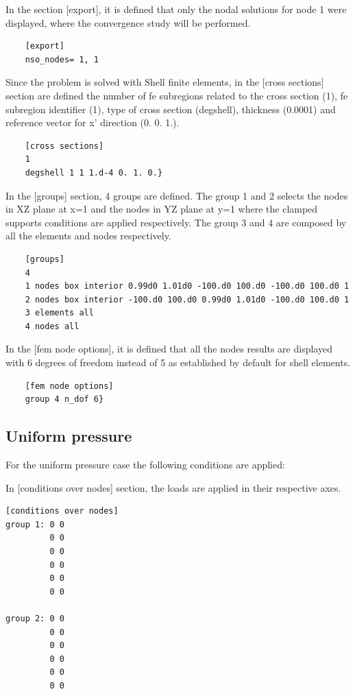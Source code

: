 \documentclass[11pt]{article}
\begin{document}
	In the section [export], it is defined that only the nodal solutions for node 1 were displayed, where the convergence study will be performed.

	\begin{verbatim}
	[export]
	nso_nodes= 1, 1
	\end{verbatim}
		
	Since the problem is solved with Shell finite elements, in the [cross sections] section are defined the number of fe subregions related to the cross section (1), fe subregion identifier (1), type of cross section (degshell), thickness (0.0001) and reference vector for x' direction (0. 0. 1.).
	
	\begin{verbatim}
	[cross sections]
	1
	degshell 1 1 1.d-4 0. 1. 0.}
	\end{verbatim}
	
	In the [groups] section, 4 groups are defined. The group 1 and 2 selects the nodes in XZ plane at x=1 and the nodes in YZ plane at y=1 where the clamped supports conditions are applied respectively. The group 3 and 4 are composed by all the elements and nodes respectively.
	
	
	\begin{verbatim}
	[groups]
	4
	1 nodes box interior 0.99d0 1.01d0 -100.d0 100.d0 -100.d0 100.d0 1
	2 nodes box interior -100.d0 100.d0 0.99d0 1.01d0 -100.d0 100.d0 1
	3 elements all
	4 nodes all
	\end{verbatim}
	
	In the [fem node options], it is defined that all the nodes results are displayed with 6 degrees of freedom instead of 5 as established by default for shell elements.
	
	\begin{verbatim}
	[fem node options]
	group 4 n_dof 6}
	\end{verbatim}
	
	\subsection*{Uniform pressure}
	
	For the uniform pressure case the following conditions are applied:
	
	In [conditions over nodes] section, the loads are applied in their respective axes.
		\begin{verbatim}
[conditions over nodes]
group 1: 0 0
         0 0
         0 0
         0 0
         0 0
         0 0

group 2: 0 0
         0 0
         0 0
         0 0
         0 0
         0 0
	\end{verbatim}
		
\end{document}

